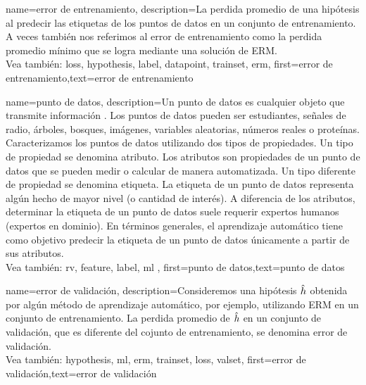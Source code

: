  {
	 name={error de entrenamiento},
	 description={La perdida promedio de una hipótesis al 
		 predecir las etiquetas de los puntos de datos en un conjunto de entrenamiento. 
		 A veces también nos referimos al error de entrenamiento como la perdida promedio mínimo 
		 que se logra mediante una solución de ERM.
		 \\
	 	Vea también: \gls{loss}, \gls{hypothesis}, \gls{label}, \gls{datapoint}, \gls{trainset}, \gls{erm}},
		 first={error de entrenamiento},text={error de entrenamiento}  
 }

{name={punto de datos},
description={Un punto de datos es cualquier objeto que transmite información \cite{coverthomas}.
		Los puntos de datos pueden ser estudiantes, señales de radio, árboles, bosques, imágenes, variables aleatorias, números reales o proteínas.
		Caracterizamos los puntos de datos utilizando dos tipos de propiedades. Un tipo de propiedad se denomina atributo. 
		Los atributos son propiedades de un punto de datos que se pueden medir o calcular de manera automatizada.  
		Un tipo diferente de propiedad se denomina etiqueta. La etiqueta de un punto de datos representa 
		algún hecho de mayor nivel (o cantidad de interés). A diferencia de los atributos, determinar la etiqueta de un punto de datos suele requerir expertos humanos (expertos en dominio). 
		En términos generales, el aprendizaje automático tiene como objetivo predecir la
		etiqueta de un punto de datos únicamente a partir de sus atributos.  
		\\
	 	Vea también: \gls{rv}, \gls{feature}, \gls{label}, \gls{ml} }, first={punto de datos},text={punto de datos}  
}


{name={error de validación},
 description={Consideremos una hipótesis $\hat{h}$ obtenida por algún método de
 	aprendizaje automático, por ejemplo, utilizando ERM en un conjunto de entrenamiento. La perdida promedio de
 	$\hat{h}$ en un conjunto de validación, que es diferente del cojunto de entrenamiento, se denomina error de validación.
	 \\
	 Vea también: \gls{hypothesis}, \gls{ml}, \gls{erm}, \gls{trainset}, \gls{loss}, \gls{valset}},
	first={error de validación},text={error de validación}  
}

